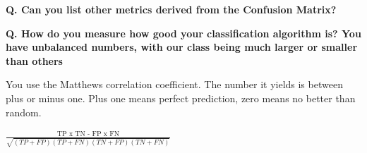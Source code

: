 \begin{frame}[fragile]{\textbf{Q. Can you list other metrics derived from the Confusion Matrix?}}
\begin{wideitemize}
  \end{wideitemize}
\end{frame}

\begin{frame}[fragile]{\textbf{Q. How do you measure how  good your
      classification algorithm is? You have unbalanced numbers, with our class
      being much larger or smaller than others}}
  \begin{wideitemize}
  \item You use the Matthews correlation coefficient. The number it yields is
    between plus or minus one. Plus one means perfect prediction, zero means no
    better than random.
  \item $\frac{\text{TP x TN - FP x FN}}{\sqrt{(TP + FP)(TP + FN)(TN + FP)(TN + FN)}}$
  \end{wideitemize}
\end{frame}


